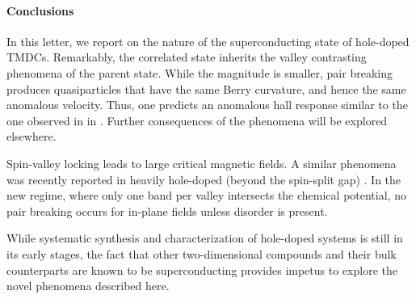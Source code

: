 \paragraph{Conclusions}

In this letter, we report on the nature of the superconducting state
of hole-doped TMDCs.
Remarkably, the correlated state inherits
the valley contrasting phenomena of the parent state.
While the magnitude is smaller, pair breaking produces quasiparticles
that have the same Berry curvature, and hence the same anomalous velocity.
Thus, one predicts an anomalous hall response similar to
the one observed in in .
Further consequences of the phenomena will be explored elsewhere.

Spin-valley locking leads to large critical magnetic fields.
A similar phenomena was recently reported in heavily hole-doped
(beyond the spin-split gap) .
In the new regime, where only one band per valley intersects
the chemical potential, no pair breaking occurs
for in-plane fields unless disorder is present.

While systematic synthesis and characterization of hole-doped systems
is still in its early stages, the fact that other two-dimensional compounds
and their bulk counterparts are known to be superconducting
provides impetus to explore the novel phenomena described here.
